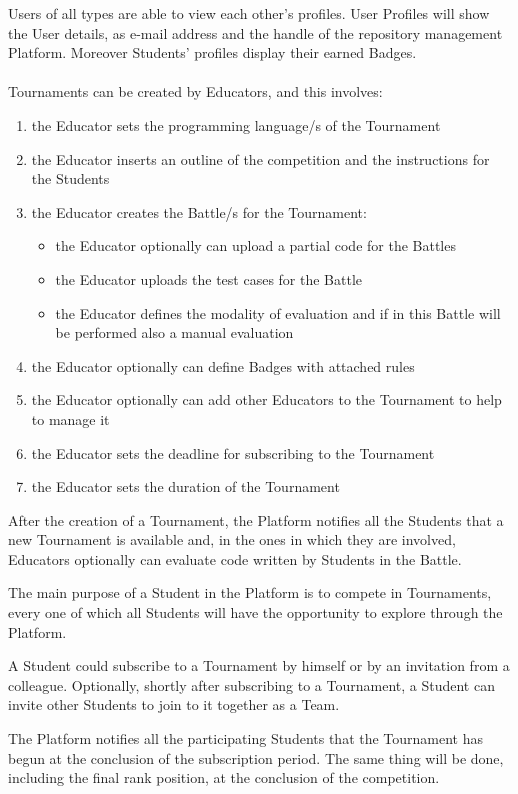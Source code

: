 Users of all types are able to view each other's profiles. User Profiles will show the User details, as e-mail address and the handle of the repository management Platform. Moreover Students' profiles display their earned Badges.\\
\\
Tournaments can be created by Educators, and this involves:
\begin{enumerate}[label=$\bullet$]
    \item the Educator sets the programming language/s of the Tournament
    \item the Educator inserts an outline of the competition and the instructions for the Students
    \item the Educator creates the Battle/s for the Tournament:
    \begin{itemize}
        \item the Educator optionally can upload a partial code for the Battles
        \item the Educator uploads the test cases for the Battle
        \item the Educator defines the modality of evaluation and if in this Battle will be performed also a manual evaluation
    \end{itemize}
    \item the Educator optionally can define Badges with attached rules
    \item the Educator optionally can add other Educators to the Tournament to help to manage it
    \item the Educator sets the deadline for subscribing to the Tournament
    \item the Educator sets the duration of the Tournament
\end{enumerate}
After the creation of a Tournament, the Platform notifies all the Students that a new Tournament is available and, in the ones in which they are involved, Educators optionally can evaluate code written by Students in the Battle.

The main purpose of a Student in the Platform is to compete in Tournaments, every one of which all Students will have the opportunity to explore through the Platform.

A Student could subscribe to a Tournament by himself or by an invitation from a colleague. Optionally, shortly after subscribing to a Tournament, a Student can invite other Students to join to it together as a Team.

The Platform notifies all the participating Students that the Tournament has begun at the conclusion of the subscription period. The same thing will be done, including the final rank position, at the conclusion of the competition.\\
\\

